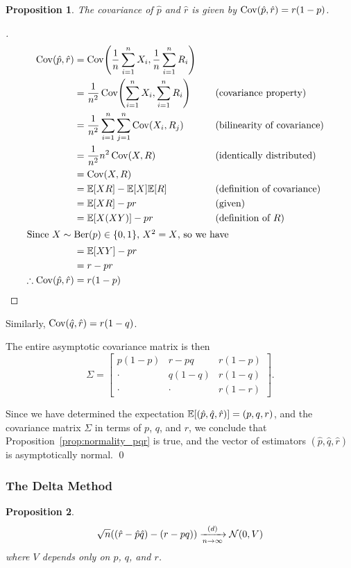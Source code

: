\documentclass[letterpaper, reqno]{amsart}
\newtheorem{prop}{Proposition}[section]
\renewcommand{\qedsymbol}{\ensuremath{\blacksquare}}
\newenvironment{subproof}[1][\proofname]{%
  \renewcommand{\qedsymbol}{\ensuremath{\square}}%
  \begin{proof}[#1]%
}{%
  \end{proof}%
}
\numberwithin{equation}{section}
\newcommand{\E}[1]{\mathbb{E}\mleft[#1\mright]}
\newcommand{\Cov}[1]{\operatorname{Cov}\mleft(#1\mright)}
\newcommand{\N}[2]{\mathcal{N}\mleft( #1, #2 \mright)}
\newcommand{\sumi}[2]{\sum_{#1=1}^{#2}}
\newcommand{\avg}[2]{\frac{1}{#2}\sumi{#1}{#2}}
\newcommand{\by}[1]{&\quad&\text{(#1)}}
\newcommand{\Dlim}{\xrightarrow[n \to \infty]{(d)}}
\newcommand{\phat}{\hat{p}}
\newcommand{\qhat}{\hat{q}}
\newcommand{\rhat}{\hat{r}}
\DeclareMathOperator{\Ber}{Ber}
\begin{document}
\begin{prop}
  The covariance of $\phat$ and $\rhat$ is given by $\Cov{\phat, \rhat} = r(1 - p)$.
\end{prop}
\begin{subproof}
  \begin{alignat*}{3}
    \Cov{\phat, \rhat} &= \Cov{\avg{i}{n} X_i, \avg{i}{n} R_i} \\
    &= \frac{1}{n^2} \Cov{\sumi{i}{n} X_i, \sumi{i}{n} R_i} \by{covariance property} \\
    &= \frac{1}{n^2} \sumi{i}{n} \sumi{j}{n} \Cov{X_i, R_j} \by{bilinearity of covariance} \\
    &= \frac{1}{n^2} n^2 \Cov{X, R} \by{identically distributed} \\
    &= \Cov{X, R}  \\
    &= \E{X R} - \E{X}\E{R} \by{definition of covariance} \\
    &= \E{X R} - pr \by{given} \\
    &= \E{X (X Y)} - pr \by{definition of $R$} \\
    \intertext{Since $X \sim \Ber(p) \in \{0, 1\}$, $X^2 = X$, so we have}
    &= \E{X Y} - pr \\
    &= r - pr \\
    \therefore \Cov{\phat, \rhat} &= r(1 - p) \tag*{\qedhere}
  \end{alignat*}
\end{subproof}
\noindent Similarly, $\Cov{\qhat, \rhat} = r(1 - q)$.

The entire asymptotic covariance matrix is then
\begin{equation} \label{eq:sigma}
  \Sigma =
  \begin{bmatrix}
    p(1-p) & r - pq & r(1-p) \\
    \cdot & q(1-q) & r(1-q) \\
    \cdot & \cdot & r(1-r)
  \end{bmatrix}.
\end{equation}

Since we have determined the expectation $\E{(\phat, \qhat, \rhat)} = (p, q,
r)$, and the covariance matrix $\Sigma$ in terms of $p$, $q$, and $r$, we
conclude that Proposition~\ref{prop:normality_pqr} is true, and the vector of
estimators $(\phat, \qhat, \rhat)$ is asymptotically normal. \qed

\subsubsection{The Delta Method}
\begin{prop} \label{prop:delta}
  \[ \sqrt{n}\mleft((\rhat - \phat\qhat) - (r - pq)\mright) \Dlim \N{0}{V} \]
  where $V$ depends only on $p$, $q$, and $r$.
\end{prop}
\end{document}
